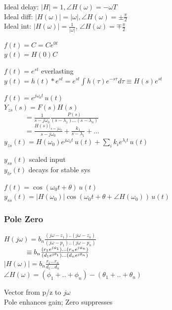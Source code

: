 \documentclass[4pt]{article}
\theoremstyle{definition}
\theoremstyle{definition}
\renewcommand{\o}{\omega}
\begin{document}
\begin{landscape}
\begin{multicols}{3}
    Ideal delay: \(|H| = 1, \angle H(\o) = -\o T\)\\      %
    Ideal diff: \(|H(\o)| = |\o|, \angle H(\o) = \pm\frac {\pi} 2\)\\
    Ideal int: \(|H(\o)| = \frac 1 {|\o|}\), \(\angle H(\o) = \mp \frac{\pi} 2\)

    \(f(t) = C = Ce^{0t}\)\\
    \(y(t) = H(0) C\)

    \(f(t) = e^{st}\) \hfill everlasting\\
    \(y(t) = h(t) * e^{st} = e^{st} \int h(\tau) e^{-s\tau} d\tau \equiv H(s) e^{st}\)

    \(f(t) = e^{j\o_0 t}\, u(t)\)\\   %
    \(Y_{zs}(s) = F(s) H(s)\)\\      %
    \(\hspace{3em}= \frac 1 {s - j\o_0} \frac{P(s)}{(s-\lambda_1)...(s-\lambda_n)}\)\\
    \(\hspace{3em}= \frac{H(s)|_{s=j\o_0}}{s-j\o_0} + \frac{k_1}{s-\lambda_1} + ...\)\\
    \(y_{zs}(t) = H(\o_0)  e^{j\o_0 t} \, u(t) + \sum_i k_i e^{\lambda_i t} \, u(t)\)

    $y_{ss}(t)$ scaled input\\
    $y_{tr}(t)$ decays for stable sys

    \(f(t) = \cos(\o_0 t + \theta) \, u(t)\)\\
    \(y_{ss}(t) = |H(\o_0)| \cos(\o_0 t + \theta + \angle H(\o_0)) \, u(t)\)

\subsubsection*{Pole Zero}
    \(H(j\o) = b_n \frac{(j\o-z_1)..(j\o-z_n)}{(j\o-p_1)..(j\o-p_n)}\)\\\
    \(\hspace{2.75em} \equiv b_n \frac{(r_1 e^{j\phi_1})...(r_n e^{j\phi_n})}{(d_1 e^{j\theta_1})... (d_n e^{j\theta_n})}\)\\
    \(|H(\o)| = b_n \frac{r_1 ... r_n}{d_1 ... d_n}\)\\
    \(\angle H(\o) = (\phi_1 + .. + \phi_n) - (\theta_1 + .. + \theta_n)\)          %

    Vector from p/z to $j\o$\\
    Pole enhances gain; Zero suppresses
\end{multicols}
\end{landscape}
\end{document}
